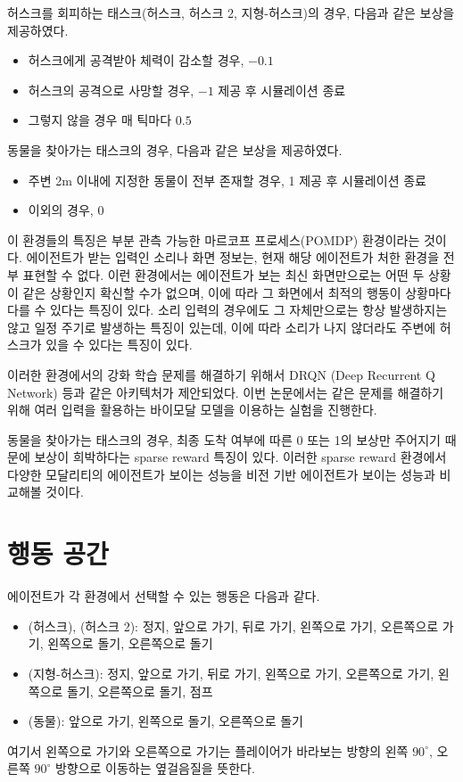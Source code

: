\documentclass[oneside, under, ko]{snuthesis}
\begin{document}
허스크를 회피하는 태스크(허스크, 허스크 2, 지형-허스크)의 경우, 다음과 같은 보상을 제공하였다.
\begin{itemize}
    \item 허스크에게 공격받아 체력이 감소할 경우, $-0.1$
    \item 허스크의 공격으로 사망할 경우, $-1$ 제공 후 시뮬레이션 종료
    \item 그렇지 않을 경우 매 틱마다 $0.5$
\end{itemize}
동물을 찾아가는 태스크의 경우, 다음과 같은 보상을 제공하였다.
\begin{itemize}
    \item 주변 2m 이내에 지정한 동물이 전부 존재할 경우, 1 제공 후 시뮬레이션 종료
    \item 이외의 경우, 0
\end{itemize}

이 환경들의 특징은 부분 관측 가능한 마르코프 프로세스(POMDP) 환경이라는 것이다. 에이전트가 받는 입력인 소리나 화면 정보는, 현재 해당 에이전트가 처한 환경을 전부 표현할 수 없다. 이런 환경에서는 에이전트가 보는 최신 화면만으로는 어떤 두 상황이 같은 상황인지 확신할 수가 없으며, 이에 따라 그 화면에서 최적의 행동이 상황마다 다를 수 있다는 특징이 있다. 소리 입력의 경우에도 그 자체만으로는 항상 발생하지는 않고 일정 주기로 발생하는 특징이 있는데, 이에 따라 소리가 나지 않더라도 주변에 허스크가 있을 수 있다는 특징이 있다.

이러한 환경에서의 강화 학습 문제를 해결하기 위해서 DRQN (Deep Recurrent Q Network) 등과 같은 아키텍처가 제안되었다. \cite{POMDP} 이번 논문에서는 같은 문제를 해결하기 위해 여러 입력을 활용하는 바이모달 모델을 이용하는 실험을 진행한다.

동물을 찾아가는 태스크의 경우, 최종 도착 여부에 따른 0 또는 1의 보상만 주어지기 때문에 보상이 희박하다는 sparse reward 특징이 있다. 이러한 sparse reward 환경에서 다양한 모달리티의 에이전트가 보이는 성능을 비전 기반 에이전트가 보이는 성능과 비교해볼 것이다.

\section{행동 공간}
에이전트가 각 환경에서 선택할 수 있는 행동은 다음과 같다.
\begin{itemize}
    \item (허스크), (허스크 2): 정지, 앞으로 가기, 뒤로 가기, 왼쪽으로 가기, 오른쪽으로 가기, 왼쪽으로 돌기, 오른쪽으로 돌기
    \item (지형-허스크): 정지, 앞으로 가기, 뒤로 가기, 왼쪽으로 가기, 오른쪽으로 가기, 왼쪽으로 돌기, 오른쪽으로 돌기, 점프
    \item (동물): 앞으로 가기, 왼쪽으로 돌기, 오른쪽으로 돌기
\end{itemize}
여기서 왼쪽으로 가기와 오른쪽으로 가기는 플레이어가 바라보는 방향의 왼쪽 $90^\circ$, 오른쪽 $90^\circ$ 방향으로 이동하는 옆걸음질을 뜻한다.
\end{document}
